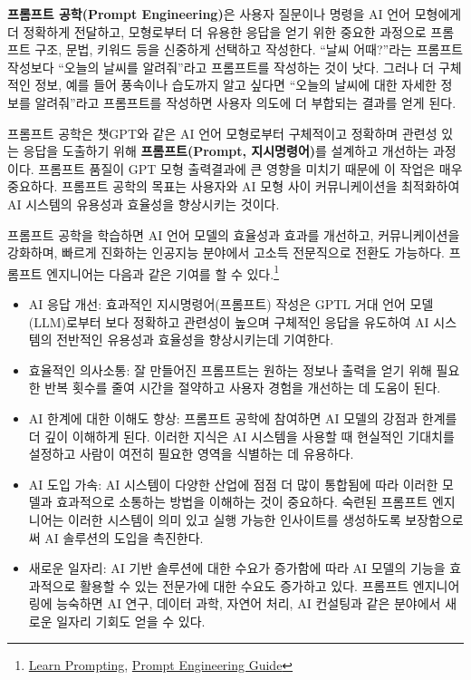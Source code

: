 \documentclass[
  letterpaper,
]{book}
\begin{document}
\textbf{프롬프트 공학(Prompt Engineering)}은 사용자 질문이나 명령을 AI
언어 모형에게 더 정확하게 전달하고, 모형로부터 더 유용한 응답을 얻기
위한 중요한 과정으로 프롬프트 구조, 문법, 키워드 등을 신중하게 선택하고
작성한다. ``날씨 어때?''라는 프롬프트 작성보다 ``오늘의 날씨를
알려줘''라고 프롬프트를 작성하는 것이 낫다. 그러나 더 구체적인 정보,
예를 들어 풍속이나 습도까지 알고 싶다면 ``오늘의 날씨에 대한 자세한
정보를 알려줘''라고 프롬프트를 작성하면 사용자 의도에 더 부합되는 결과를
얻게 된다.

프롬프트 공학은 챗GPT와 같은 AI 언어 모형로부터 구체적이고 정확하며
관련성 있는 응답을 도출하기 위해 \textbf{프롬프트(Prompt, 지시명령어)}를
설계하고 개선하는 과정이다. 프롬프트 품질이 GPT 모형 출력결과에 큰
영향을 미치기 때문에 이 작업은 매우 중요하다. 프롬프트 공학의 목표는
사용자와 AI 모형 사이 커뮤니케이션을 최적화하여 AI 시스템의 유용성과
효율성을 향상시키는 것이다.

프롬프트 공학을 학습하면 AI 언어 모델의 효율성과 효과를 개선하고,
커뮤니케이션을 강화하며, 빠르게 진화하는 인공지능 분야에서 고소득
전문직으로 전환도 가능하다. 프롬프트 엔지니어는 다음과 같은 기여를 할 수
있다.\footnote{\href{https://learnprompting.org/}{Learn Prompting},
  \href{https://www.promptingguide.ai/}{Prompt Engineering Guide}}

\begin{itemize}
\item
  AI 응답 개선: 효과적인 지시명령어(프롬프트) 작성은 GPTL 거대 언어
  모델(LLM)로부터 보다 정확하고 관련성이 높으며 구체적인 응답을 유도하여
  AI 시스템의 전반적인 유용성과 효율성을 향상시키는데 기여한다.
\item
  효율적인 의사소통: 잘 만들어진 프롬프트는 원하는 정보나 출력을 얻기
  위해 필요한 반복 횟수를 줄여 시간을 절약하고 사용자 경험을 개선하는 데
  도움이 된다.
\item
  AI 한계에 대한 이해도 향상: 프롬프트 공학에 참여하면 AI 모델의 강점과
  한계를 더 깊이 이해하게 된다. 이러한 지식은 AI 시스템을 사용할 때
  현실적인 기대치를 설정하고 사람이 여전히 필요한 영역을 식별하는 데
  유용하다.
\item
  AI 도입 가속: AI 시스템이 다양한 산업에 점점 더 많이 통합됨에 따라
  이러한 모델과 효과적으로 소통하는 방법을 이해하는 것이 중요하다.
  숙련된 프롬프트 엔지니어는 이러한 시스템이 의미 있고 실행 가능한
  인사이트를 생성하도록 보장함으로써 AI 솔루션의 도입을 촉진한다.
\item
  새로운 일자리: AI 기반 솔루션에 대한 수요가 증가함에 따라 AI 모델의
  기능을 효과적으로 활용할 수 있는 전문가에 대한 수요도 증가하고 있다.
  프롬프트 엔지니어링에 능숙하면 AI 연구, 데이터 과학, 자연어 처리, AI
  컨설팅과 같은 분야에서 새로운 일자리 기회도 얻을 수 있다.
\end{itemize}
\end{document}
